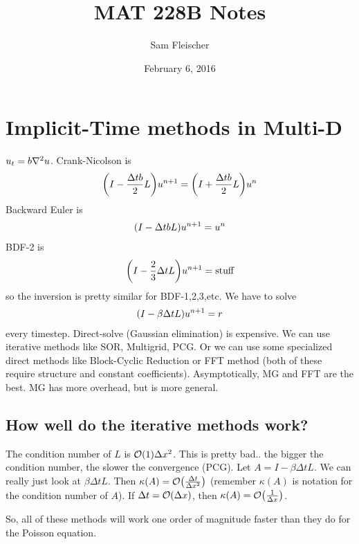\documentclass{article}
\title{MAT 228B Notes}
\author{Sam Fleischer}
\date{February 6, 2016}
\newcommand{\Dx}{\Delta x}
\newcommand{\Dt}{\Delta t}
\begin{document}
    \maketitle

    \section{Implicit-Time methods in Multi-D}

        $u_t = b \laplacian u$.  Crank-Nicolson is
        \begin{align*}
            \qty(I - \frac{\Dt b}{2}L)u^{n+1} = \qty(I + \frac{\Dt b}{2}L)u^n
        \end{align*}
        Backward Euler is
        \begin{align*}
            \qty(I - \Dt b L)u^{n+1} = u^n
        \end{align*}
        BDF-2 is
        \begin{align*}
            \qty(I - \frac{2}{3}\Dt L)u^{n+1} = \text{stuff}
        \end{align*}
        so the inversion is pretty similar for BDF-1,2,3,etc.  We have to solve
        \begin{align*}
            \qty(I - \beta\Dt L)u^{n+1} = r
        \end{align*}
        every timestep.  Direct-solve (Gaussian elimination) is expensive.  We can use iterative methods like SOR, Multigrid, PCG.  Or we can use some specialized direct methods like Block-Cyclic Reduction or FFT method (both of these require structure and constant coefficients).  Asymptotically, MG and FFT are the best.  MG has more overhead, but is more general.

        \subsection{How well do the iterative methods work?}
            The condition number of $L$ is $\order{1}{\Dx^2}$.  This is pretty bad.. the bigger the condition number, the slower the convergence (PCG).  Let $A = I - \beta\Dt L$.  We can really just look at $\beta\Dt L$.  Then $\kappa(A) = \order{\frac{\Dt}{\Dx^2}}$ (remember $\kappa(A)$ is notation for the condition number of $A$).  If $\Dt = \order{\Dx}$, then $\kappa(A) = \order{\frac{1}{\Dx}}$.

            So, all of these methods will work one order of magnitude faster than they do for the Poisson equation.
\end{document}

